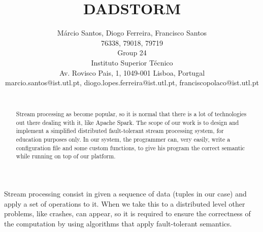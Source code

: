\documentclass[times, 10pt,twocolumn]{article}
\begin{document}
\title{DADSTORM}

\author{Márcio Santos, Diogo Ferreira, Francisco Santos\\
76338, 79018, 79719\\Group 24\\Instituto Superior Técnico \\ Av. Rovisco Pais, 1, 1049-001 Lisboa, Portugal\\ marcio.santos@ist.utl.pt, diogo.lopes.ferreira@ist.utl.pt, franciscopolaco@ist.utl.pt\\
\\}

\maketitle
\thispagestyle{empty}

\begin{abstract}
	Stream processing as become popular, so it is normal that there is a lot of technologies out there dealing with it, like Apache Spark.
	The scope of our work is to design and implement a simplified distributed fault-tolerant stream processing system, for education purposes only.
	In our system, the programmer can, very easily, write a configuration file and some custom functions, to give his program the correct semantic while running on top of our platform.
\end{abstract}




Stream processing consist in given a sequence of data (tuples in our case) and apply a set of operations to it. When we take this to a distributed level other problems, like crashes, can appear,
 so it is required to ensure the correctness of the computation by using algorithms that apply fault-tolerant semantics.
 
\end{document}
